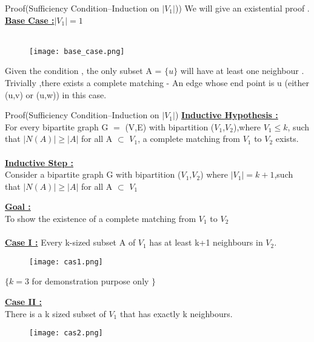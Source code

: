 \documentclass[12pt]{beamer}
\begin{document}
\begin{frame}{Proof(Sufficiency Condition--Induction on $|V_1|$))}
We will give an existential proof .
\underline{\textbf{Base Case :}}$ |V_1| = 1$\\~\\
\begin{figure}[h]
\texttt{[image: base\_case.png]}
\end{figure}
Given the condition , the only subset A = $\{u\}$ will have at least one neighbour . Trivially ,there exists a complete matching - An edge whose end point is u (either (u,v) or (u,w)) in this case.
\end{frame}

\begin{frame}{Proof(Sufficiency Condition--Induction on $|V_1|$)}
\underline{\textbf{Inductive Hypothesis :}}\\
For every bipartite graph G $=$ (V,E) with bipartition ($V_1$,$V_2$),where $V_1 \leq k$, such that $|N(A)| \geq |A|$ for all A $\subset$ $V_1$, a complete matching from $V_1$ to $V_2$ exists.\\~\\

\underline{\textbf{Inductive Step :}}\\ 
Consider a bipartite graph G with bipartition ($V_1$,$V_2$) where $|V_1| = k+1$,such that $|N(A)| \geq |A|$ for all A $\subset$ $V_1$
\end{frame}

\begin{frame}
\underline{\textbf{Goal :}}\\
To show the existence of a complete matching from $V_1$ to $V_2$\\~\\

\underline{\textbf{Case I :}}
Every k-sized subset A of $V_1$ has at least k+1 neighbours in $V_2$.
\begin{figure}[h]
\texttt{[image: cas1.png]}
\end{figure}

$\{k = 3$ for demonstration purpose only $\}$
\end{frame}

\begin{frame}
\underline{\textbf{Case II :}}\\
There is a k sized subset of $V_1$ that has exactly k neighbours.\
\begin{figure}[h]
\texttt{[image: cas2.png]}
\end{figure}
\end{frame}
\end{document}
